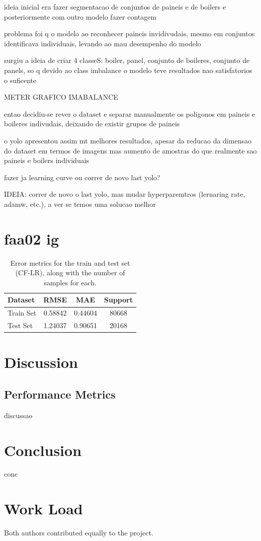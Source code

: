 \documentclass[conference]{IEEEtran}
\begin{document}
ideia inicial era fazer segmentacao de conjuntos de paineis e de boilers e posteriormente com outro modelo fazer contagem

problema foi q o modelo ao reconhecer paineis invidivudais, mesmo em conjuntos identificava individuais, levando ao mau desempenho do modelo

surgiu a ideia de criar 4 classeS: boiler, panel, conjunto de boileres, conjunto de panels, so q devido ao class imbalance o modelo teve resultados nao satisfatorios o suficente

METER GRAFICO IMABALANCE

entao decidiu-se rever o dataset e separar manualmente os poligonos em paineis e boileres indivudais, deixando de existir grupos de paineis

o yolo apresentou assim mt melhores resultados, apesar da reducao da dimensao do dataset em termos de imagens mas aumento de amostras do que realmente sao paineis e boilers individuais


fazer ja learning curve ou correr de novo last yolo?

IDEIA: correr de novo o last yolo, mas mudar hyperparemtros (lernaring rate, adamw, etc.), a ver se temos uma solucao melhor



\section{faa02 ig}



\begin{table}[H]
\centering
\caption{Error metrics for the train and test set (CF-LR), along with the number of samples for each.}
\label{tab:model01_results}
\begin{tabular}{lccc}
\toprule
\textbf{Dataset} & \textbf{RMSE} & \textbf{MAE} & \textbf{Support} \\
\midrule
Train Set & 0.58842 & 0.44604 & 80668 \\
Test Set & 1.24037 & 0.90651 & 20168 \\
\bottomrule
\end{tabular}
\end{table}

\section{Discussion} 

\subsection{Performance Metrics}

discussao


\section{Conclusion}

conc


\section*{Work Load}

Both authors contributed equally to the project.



\end{document}
